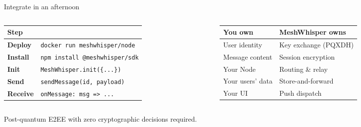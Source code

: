 \documentclass[aspectratio=169, 11pt]{beamer}
\begin{document}
\begin{frame}{Integrate in an afternoon}
\vspace{2mm}
\begin{columns}[T]
  \begin{column}{0.50\textwidth}
    \begin{tabularx}{\linewidth}{@{}>{\bfseries\small}lX@{}}
    \toprule
    Step & \\
    \midrule
    Deploy  & \texttt{\small docker run meshwhisper/node} \\[3pt]
    Install & \texttt{\small npm install @meshwhisper/sdk} \\[3pt]
    Init    & \texttt{\small MeshWhisper.init(\{...\})} \\[3pt]
    Send    & \texttt{\small sendMessage(id, payload)} \\[3pt]
    Receive & \texttt{\small onMessage: msg => ...} \\
    \bottomrule
    \end{tabularx}
  \end{column}
  \begin{column}{0.46\textwidth}
    \vspace{1mm}
    \begin{tabularx}{\linewidth}{@{}XX@{}}
    \toprule
    \textbf{\small\color{mwblue}You own} & \textbf{\small\color{mwblue}MeshWhisper owns} \\
    \midrule
    \small User identity & \small Key exchange (PQXDH) \\
    \small Message content & \small Session encryption \\
    \small Your Node & \small Routing \& relay \\
    \small Your users' data & \small Store-and-forward \\
    \small Your UI & \small Push dispatch \\
    \bottomrule
    \end{tabularx}
  \end{column}
\end{columns}
\vspace{5mm}
\centering
{\small\color{mwgray}Post-quantum E2EE with zero cryptographic decisions required.}
\end{frame}
\end{document}
